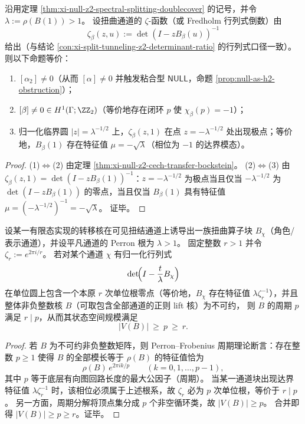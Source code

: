 \begin{corollary}\label{cor:xi-null-z2-analytic-pole-criterion}
沿用定理 \ref{thm:xi-null-z2-spectral-splitting-doublecover} 的记号，并令 \(\lambda:=\rho(B(1))>1\)。
设扭曲通道的 \(\zeta\)-函数（或 Fredholm 行列式倒数）由
\[
\zeta_\beta(z,u):=\det(I-zB_\beta(u))^{-1}
\]
给出（与结论 \ref{con:xi-split-tunneling-z2-determinant-ratio} 的行列式口径一致）。
则以下命题等价：
\begin{enumerate}
  \item \([\alpha_2]\neq 0\)（从而 \([\alpha]\neq 0\) 并触发粘合型 \(\mathsf{NULL}\)，命题 \ref{prop:null-as-h2-obstruction}）；
  \item \([\beta]\neq 0\in H^1(\Gamma;\ZZ_2)\)（等价地存在闭环 \(p\) 使 \(\chi_\beta(p)=-1\)）；
  \item 归一化临界圆 \(|z|=\lambda^{-1/2}\) 上，\(\zeta_\beta(z,1)\) 在点 \(z=-\lambda^{-1/2}\) 处出现极点；等价地，\(B_\beta(1)\) 存在特征值 \(\mu=-\sqrt{\lambda}\)（相位为 \(-1\) 的达界模态）。
\end{enumerate}
\end{corollary}

\begin{proof}
(1)\(\Leftrightarrow\)(2) 由定理 \ref{thm:xi-null-z2-cech-transfer-bockstein}。
(2)\(\Leftrightarrow\)(3) 由 \(\zeta_\beta(z,1)=\det(I-zB_\beta(1))^{-1}\)：\(z=-\lambda^{-1/2}\) 为极点当且仅当 \(-\lambda^{-1/2}\) 为 \(\det(I-zB_\beta(1))\) 的零点，当且仅当 \(B_\beta(1)\) 具有特征值 \(\mu=(-\lambda^{-1/2})^{-1}=-\sqrt{\lambda}\)。
证毕。
\end{proof}

\begin{theorem}\label{thm:xi-cech-torsion-forces-period}
设某一有限态实现的转移核在可见扭结通道上诱导出一族扭曲算子块 \(B_\chi\)（角色/表示通道），并设平凡通道的 Perron 根为 \(\lambda>1\)。
固定整数 \(r>1\) 并令 \(\zeta_r:=e^{2\pi i/r}\)。
若对某个通道 \(\chi\) 有归一化行列式
\[
\det\!\Bigl(I-\frac{t}{\lambda}B_\chi\Bigr)
\]
在单位圆上包含一个本原 \(r\) 次单位根零点（等价地，\(B_\chi\) 存在特征值 \(\lambda\zeta_r^{-1}\)），并且整体非负整数核 \(B\)（可取包含全部通道的正则 lift 核）为不可约，
则 \(B\) 的周期 \(p\) 满足 \(r\mid p\)，从而其状态空间规模满足
\[
|V(B)|\ \ge\ p\ \ge\ r.
\]
\end{theorem}
\begin{proof}
若 \(B\) 为不可约非负整数矩阵，则 Perron--Frobenius 周期理论断言：存在整数 \(p\ge 1\) 使得 \(B\) 的全部模长等于 \(\rho(B)\) 的特征值恰为
\[
\rho(B)\,e^{2\pi i k/p}\qquad (k=0,1,\dots,p-1),
\]
其中 \(p\) 等于底层有向图回路长度的最大公因子（周期）。
当某一通道块出现达界特征值 \(\lambda\zeta_r^{-1}\) 时，该相位必须属于上述根系，故 \(\zeta_r\) 必为 \(p\) 次单位根，等价于 \(r\mid p\)。
另一方面，周期分解将顶点集分成 \(p\) 个非空循环类，故 \(|V(B)|\ge p\)。
合并即得 \(|V(B)|\ge p\ge r\)。证毕。
\end{proof}

\endinput
